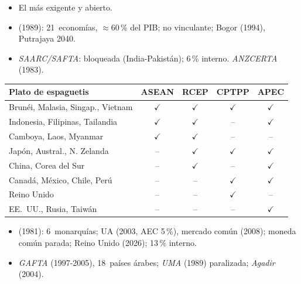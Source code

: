 \documentclass{article}
\begin{document}
\begin{columnas}
\begin{itemize}
\begin{itemize}
  \item El más exigente y abierto.
  \end{itemize}
\end{itemize}
\begin{itemize}
\item {} (1989): 21~economías, $\approx$60\,\% del PIB; no vinculante; Bogor (1994), Putrajaya 2040.
\item \emph{SAARC/SAFTA}: bloqueada (India-Pakistán); 6\,\% interno. \emph{ANZCERTA} (1983).
\end{itemize}
\begin{center}\small
\newcommand{\si}{\textcolor{tceeverde}{$\checkmark$}}
\newcommand{\no}{\textcolor{tceegris}{--}}
\renewcommand{\arraystretch}{1.1}
\begin{tabular}{@{}>{\raggedright\arraybackslash}p{3.9cm}c@{\ }c@{\ }c@{\ }c@{}}
\textbf{Plato de espaguetis} & \textbf{ASEAN} & \textbf{RCEP} & \textbf{CPTPP} & \textbf{APEC}\\ \hline
Brunéi, Malasia, Singap., Vietnam & \si & \si & \si & \si\\
Indonesia, Filipinas, Tailandia & \si & \si & \no & \si\\
Camboya, Laos, Myanmar & \si & \si & \no & \no\\
Japón, Austral., N. Zelanda & \no & \si & \si & \si\\
China, Corea del Sur & \no & \si & \no & \si\\
Canadá, México, Chile, Perú & \no & \no & \si & \si\\
Reino Unido & \no & \no & \si & \no\\
EE.~UU., Rusia, Taiwán & \no & \no & \no & \si\\ \hline
\end{tabular}
\end{center}

\begin{itemize}
\item {} (1981): 6~monarquías; UA (2003, AEC 5\,\%), mercado común (2008); moneda común parada; Reino Unido (2026); 13\,\% interno.
\item \emph{GAFTA} (1997-2005), 18~países árabes; \emph{UMA} (1989) paralizada; \emph{Agadir} (2004).
\end{itemize}


\end{columnas}
\end{document}
